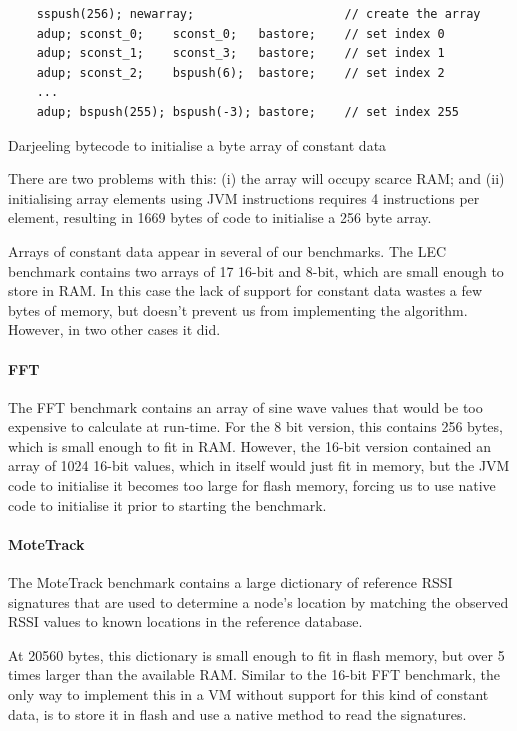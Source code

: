 \begin{listing}
\begin{verbatim}
    sspush(256); newarray;                     // create the array
    adup; sconst_0;    sconst_0;   bastore;    // set index 0
    adup; sconst_1;    sconst_3;   bastore;    // set index 1
    adup; sconst_2;    bspush(6);  bastore;    // set index 2
    ...
    adup; bspush(255); bspush(-3); bastore;    // set index 255
\end{verbatim}
\caption{Darjeeling bytecode to initialise a byte array of constant data}
\label{lst-constant-array-initialisation}
\end{listing}


There are two problems with this: (i) the array will occupy scarce RAM; and (ii) initialising array elements using JVM instructions requires 4 instructions per element, resulting in 1669 bytes of code to initialise a 256 byte array.

Arrays of constant data appear in several of our benchmarks. The LEC benchmark contains two arrays of 17 16-bit and 8-bit, which are small enough to store in RAM. In this case the lack of support for constant data wastes a few bytes of memory, but doesn't prevent us from implementing the algorithm. However, in two other cases it did.

\paragraph{FFT}
The FFT benchmark contains an array of sine wave values that would be too expensive to calculate at run-time. For the 8 bit version, this contains 256 bytes, which is small enough to fit in RAM. However, the 16-bit version contained an array of 1024 16-bit values, which in itself would just fit in memory, but the JVM code to initialise it becomes too large for flash memory, forcing us to use native code to initialise it prior to starting the benchmark.

\paragraph{MoteTrack}
The MoteTrack benchmark contains a large dictionary of reference RSSI signatures that are used to determine a node's location by matching the observed RSSI values to known locations in the reference database.

At 20560 bytes, this dictionary is small enough to fit in flash memory, but over 5 times larger than the available RAM. Similar to the 16-bit FFT benchmark, the only way to implement this in a VM without support for this kind of constant data, is to store it in flash and use a native method to read the signatures.

